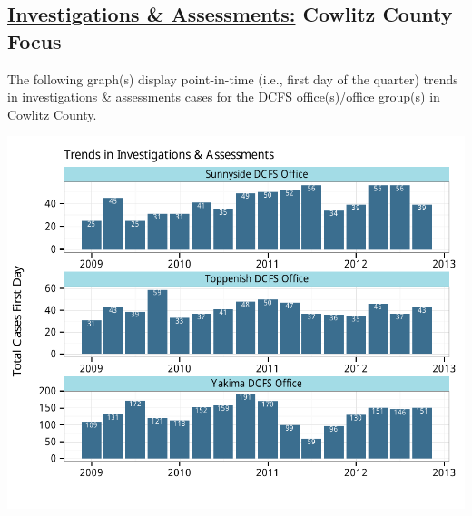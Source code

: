 \documentclass{article}\usepackage[]{graphicx}\usepackage[]{color}
\makeatletter
\def\maxwidth{ %
  \ifdim\Gin@nat@width>\linewidth
    \linewidth
  \else
    \Gin@nat@width
  \fi
}
\newenvironment{knitrout}{}{} %
\makeatother
\begin{document}
\begin{minipage}{\textwidth}
\subsection{\href{http://www.partnersforourchildren.org//child-well-being/visualizations/investigations-assessments/trends}
{Investigations \& Assessments:} Cowlitz County Focus}
The following graph(s) display point-in-time (i.e., first day of the quarter) trends in investigations \& assessments cases for the DCFS office(s)/office group(s) in Cowlitz County.  
\begin{knitrout}
\color{fgcolor}

{\centering \includegraphics[width=\maxwidth]{figure/ia_focus} 

}



\end{knitrout}

\end{minipage}

\newpage
\end{document}
